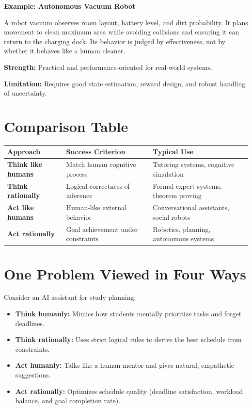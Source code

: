 \documentclass[12pt,a4paper]{article}
\begin{document}
\begin{examplebox}
\textbf{Example: Autonomous Vacuum Robot}

A robot vacuum observes room layout, battery level, and dirt probability.
It plans movement to clean maximum area while avoiding collisions and ensuring it can return to the charging dock.
Its behavior is judged by effectiveness, not by whether it behaves like a human cleaner.
\end{examplebox}

\textbf{Strength:} Practical and performance-oriented for real-world systems.

\textbf{Limitation:} Requires good state estimation, reward design, and robust handling of uncertainty.

\section{Comparison Table}

\begin{center}
\small
\begin{tabularx}{\textwidth}{>{\bfseries}l X X}
\toprule
Approach & Success Criterion & Typical Use \\
\midrule
Think like humans & Match human cognitive process & Tutoring systems, cognitive simulation \\
Think rationally & Logical correctness of inference & Formal expert systems, theorem proving \\
Act like humans & Human-like external behavior & Conversational assistants, social robots \\
Act rationally & Goal achievement under constraints & Robotics, planning, autonomous systems \\
\bottomrule
\end{tabularx}
\end{center}

\section{One Problem Viewed in Four Ways}

Consider an AI assistant for study planning:
\begin{itemize}
    \item \textbf{Think humanly:} Mimics how students mentally prioritize tasks and forget deadlines.
    \item \textbf{Think rationally:} Uses strict logical rules to derive the best schedule from constraints.
    \item \textbf{Act humanly:} Talks like a human mentor and gives natural, empathetic suggestions.
    \item \textbf{Act rationally:} Optimizes schedule quality (deadline satisfaction, workload balance, and goal completion rate).
\end{itemize}
\end{document}

